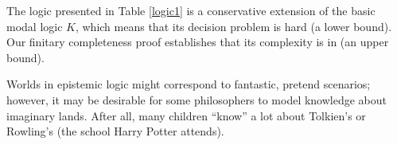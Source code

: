 The logic presented in Table \ref{logic1} is a conservative extension of the
basic modal logic $K$, which means that its decision problem is
 hard (a lower bound).
Our finitary completeness proof
establishes that its complexity is in  (an upper bound).

Worlds in epistemic logic might correspond to fantastic, pretend scenarios;
however, it may be desirable for some philosophers to model knowledge about
imaginary lands.  After all, many children ``know'' a lot about Tolkien's
{} or Rowling's {} (the school Harry Potter
attends).

